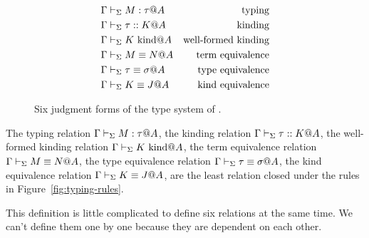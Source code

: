 \begin{figure}
    \begin{center}
        \begin{align*}
            \Gamma & \vdash_\Sigma M : \tau @ A       & \text{typing}              \\
            \Gamma & \vdash_\Sigma \tau :: K @ A      & \text{kinding}             \\
            \Gamma & \vdash_\Sigma K \text{\ kind} @ A      & \text{well-formed kinding} \\
            \Gamma & \vdash_\Sigma M \equiv N @ A         & \text{term equivalence}    \\
            \Gamma & \vdash_\Sigma \tau \equiv \sigma @ A & \text{type equivalence}    \\
            \Gamma & \vdash_\Sigma K \equiv J @ A         & \text{kind equivalence}
        \end{align*}
        \caption{Six judgment forms of the type system of \LMD.}
        \label{fig:LMD-six-judgments}
    \end{center}
\end{figure}

\begin{definition}
    The typing relation $ \Gamma \vdash_\Sigma M : \tau @ A $,
    the kinding relation $\Gamma \vdash_\Sigma \tau :: K @ A$,
    the well-formed kinding relation $\Gamma \vdash_\Sigma K \text{\ kind} @ A$,
    the term equivalence relation $\Gamma \vdash_\Sigma M \equiv N @ A$,
    the type equivalence relation $\Gamma \vdash_\Sigma \tau \equiv \sigma @ A$,
    the kind equivalence relation $\Gamma \vdash_\Sigma K \equiv J @ A$,
    are the least relation closed under the rules in Figure~\ref{fig:typing-rules}.
\end{definition}
This definition is little complicated to define six relations at the same time.
We can't define them one by one because they are dependent on each other.

